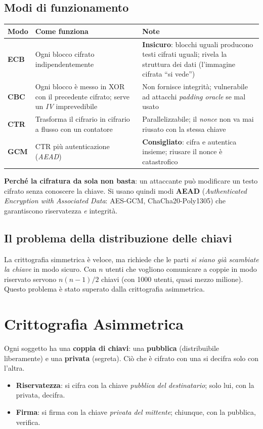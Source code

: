 \subsection{Modi di funzionamento}
\begin{center}
\small
\begin{tabularx}{\textwidth}{@{}>{\raggedright\arraybackslash}p{2.1cm}XX@{}}
\toprule
\textbf{Modo} & \textbf{Come funziona} & \textbf{Note} \\
\midrule
\textbf{ECB} & Ogni blocco cifrato indipendentemente & \textbf{Insicuro}: blocchi uguali producono testi cifrati uguali; rivela la struttura dei dati (l'immagine cifrata ``si vede'') \\
\textbf{CBC} & Ogni blocco è messo in XOR con il precedente cifrato; serve un \emph{IV} imprevedibile & Non fornisce integrità; vulnerabile ad attacchi \emph{padding oracle} se mal usato \\
\textbf{CTR} & Trasforma il cifrario in cifrario a flusso con un contatore & Parallelizzabile; il \emph{nonce} non va mai riusato con la stessa chiave \\
\textbf{GCM} & CTR più autenticazione (\emph{AEAD}) & \textbf{Consigliato}: cifra e autentica insieme; riusare il nonce è catastrofico \\
\bottomrule
\end{tabularx}
\end{center}
\textbf{Perché la cifratura da sola non basta}: un attaccante può modificare un testo cifrato senza conoscere la chiave. Si usano quindi modi \textbf{AEAD} (\emph{Authenticated Encryption with Associated Data}: AES-GCM, ChaCha20-Poly1305) che garantiscono riservatezza \emph{e} integrità.

\subsection{Il problema della distribuzione delle chiavi}
La crittografia simmetrica è veloce, ma richiede che le parti \emph{si siano già scambiate la chiave} in modo sicuro. Con $n$ utenti che vogliono comunicare a coppie in modo riservato servono $n(n-1)/2$ chiavi (con 1000 utenti, quasi mezzo milione). Questo problema è stato superato dalla crittografia asimmetrica.

\section{Crittografia Asimmetrica}
Ogni soggetto ha una \textbf{coppia di chiavi}: una \textbf{pubblica} (distribuibile liberamente) e una \textbf{privata} (segreta). Ciò che è cifrato con una si decifra solo con l'altra.
\begin{itemize}
    \item \textbf{Riservatezza}: si cifra con la chiave \emph{pubblica del destinatario}; solo lui, con la privata, decifra.
    \item \textbf{Firma}: si firma con la chiave \emph{privata del mittente}; chiunque, con la pubblica, verifica.
\end{itemize}

